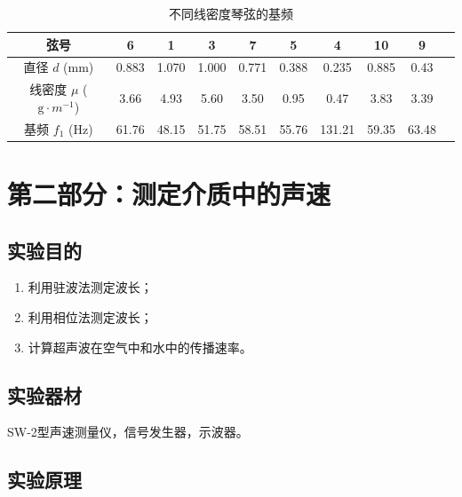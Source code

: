 \documentclass[UTF8]{article}
\theoremstyle{MyLineTheoremStyle} %
\theoremstyle{MyBlockTheoremStyle} %
\theoremstyle{MySubsubsectionStyle} %
\begin{document}
\begin{table}[H]\centering
    \caption{不同线密度琴弦的基频}
    \label{不同线密度琴弦的基频}
\begin{tabular}{cccccccccc}\toprule
    弦号 & 6 & 1 & 3 & 7 & 5 & 4 & 10 & 9  \\
    \midrule
    直径 $d$ (mm) 
    & 0.883 & 1.070 & 1.000 & 0.771 & 0.388 & 0.235 & 0.885 & 0.43  \\
    线密度 $\mu$ ($\mathrm{g}\cdot m^{-1}$)
    & 3.66 & 4.93 & 5.60 & 3.50 & 0.95 & 0.47 & 3.83 & 3.39  \\
    基频 $f_1$ (Hz) 
    & 61.76 & 48.15 & 51.75 & 58.51 & 55.76 & 131.21 & 59.35 & 63.48 \\
    \bottomrule
\end{tabular}
\end{table}


\section{第二部分：测定介质中的声速}

\subsection{实验目的}
\begin{enumerate}
\item 利用驻波法测定波长；
\item 利用相位法测定波长；
\item 计算超声波在空气中和水中的传播速率。
\end{enumerate}

\subsection{实验器材}
SW-2型声速测量仪，信号发生器，示波器。

\subsection{实验原理}
\end{document}
